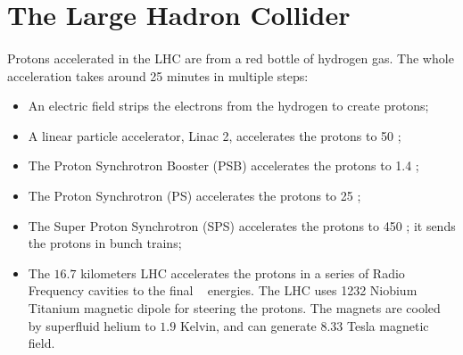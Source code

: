\section{The Large Hadron Collider}
\label{sec:LHC}
\paragraph{}
Protons accelerated in the LHC are from a red bottle of hydrogen gas. The whole acceleration takes around 25 minutes in multiple steps:
\begin{itemize}
\item An electric field strips the electrons from the hydrogen to create protons; 
\item A linear particle accelerator, Linac 2, accelerates the protons to 50 \MeV; 
\item The Proton Synchrotron Booster (PSB) accelerates the protons to 1.4 \GeV;
\item The Proton Synchrotron (PS) accelerates the protons to 25 \GeV; 
\item The Super Proton Synchrotron (SPS) accelerates the protons to 450 \GeV; it sends the protons in bunch trains;
\item The $16.7$ kilometers LHC accelerates the protons in a series of Radio Frequency cavities to the final \TeV~ energies. The LHC uses 1232 Niobium Titanium magnetic dipole for steering the protons. The magnets are cooled by superfluid helium to $1.9$ Kelvin, and can generate $8.33$ Tesla magnetic field.
\end{itemize}

